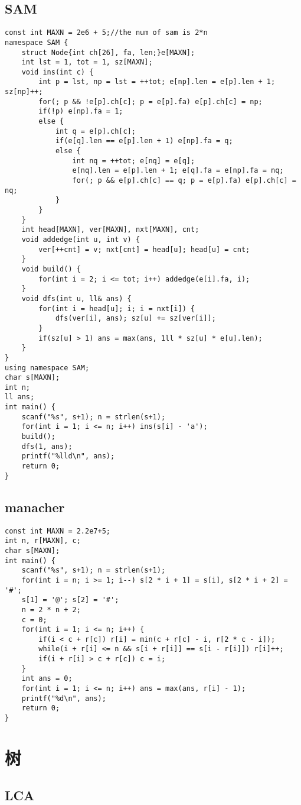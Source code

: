 \documentclass{article}
\begin{document}
   \subsection{SAM}
   \begin{lstlisting}
const int MAXN = 2e6 + 5;//the num of sam is 2*n
namespace SAM {
	struct Node{int ch[26], fa, len;}e[MAXN];
	int lst = 1, tot = 1, sz[MAXN];
	void ins(int c) {
		int p = lst, np = lst = ++tot; e[np].len = e[p].len + 1; sz[np]++;
		for(; p && !e[p].ch[c]; p = e[p].fa) e[p].ch[c] = np;
		if(!p) e[np].fa = 1;
		else {
			int q = e[p].ch[c];
			if(e[q].len == e[p].len + 1) e[np].fa = q;
			else {
				int nq = ++tot; e[nq] = e[q];
				e[nq].len = e[p].len + 1; e[q].fa = e[np].fa = nq;
				for(; p && e[p].ch[c] == q; p = e[p].fa) e[p].ch[c] = nq;
			}
		}
	}
	int head[MAXN], ver[MAXN], nxt[MAXN], cnt;
	void addedge(int u, int v) {
		ver[++cnt] = v; nxt[cnt] = head[u]; head[u] = cnt;
	}
	void build() {
		for(int i = 2; i <= tot; i++) addedge(e[i].fa, i);
	}
	void dfs(int u, ll& ans) {
		for(int i = head[u]; i; i = nxt[i]) {
			dfs(ver[i], ans); sz[u] += sz[ver[i]];
		}
		if(sz[u] > 1) ans = max(ans, 1ll * sz[u] * e[u].len);
	}
}
using namespace SAM;
char s[MAXN];
int n;
ll ans;
int main() {
	scanf("%s", s+1); n = strlen(s+1);
	for(int i = 1; i <= n; i++) ins(s[i] - 'a');
	build();
	dfs(1, ans);
	printf("%lld\n", ans);
	return 0;
}
   \end{lstlisting}
   \subsection{manacher}
   \begin{lstlisting}
const int MAXN = 2.2e7+5;
int n, r[MAXN], c;
char s[MAXN];
int main() {
	scanf("%s", s+1); n = strlen(s+1);
	for(int i = n; i >= 1; i--) s[2 * i + 1] = s[i], s[2 * i + 2] = '#';
	s[1] = '@'; s[2] = '#';
	n = 2 * n + 2;
	c = 0;
	for(int i = 1; i <= n; i++) {
		if(i < c + r[c]) r[i] = min(c + r[c] - i, r[2 * c - i]);
		while(i + r[i] <= n && s[i + r[i]] == s[i - r[i]]) r[i]++;
		if(i + r[i] > c + r[c]) c = i;
	}
	int ans = 0;
	for(int i = 1; i <= n; i++) ans = max(ans, r[i] - 1);
	printf("%d\n", ans);
	return 0;
}
   \end{lstlisting}
   \section{树}
   \subsection{LCA}
\end{document}
